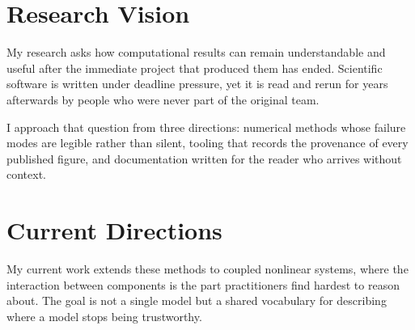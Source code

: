 \documentclass[type=research]{careerdossier-statement}
\begin{document}
\MakeCDossierStatementHeader

\section*{Research Vision}

My research asks how computational results can remain understandable and
useful after the immediate project that produced them has ended. Scientific
software is written under deadline pressure, yet it is read and rerun for
years afterwards by people who were never part of the original team.

I approach that question from three directions: numerical methods whose
failure modes are legible rather than silent, tooling that records the
provenance of every published figure, and documentation written for the
reader who arrives without context.

\newpage

\section*{Current Directions}

My current work extends these methods to coupled nonlinear systems, where the
interaction between components is the part practitioners find hardest to
reason about. The goal is not a single model but a shared vocabulary for
describing where a model stops being trustworthy.
\end{document}
